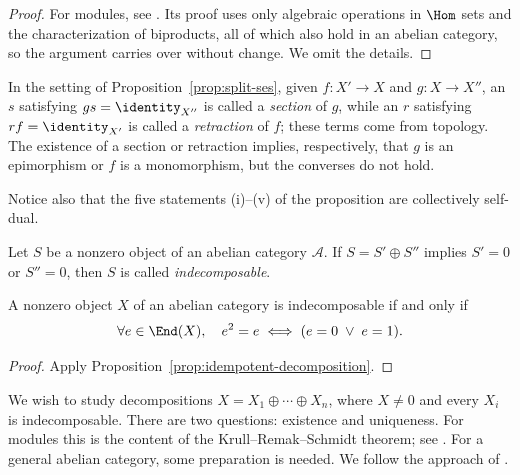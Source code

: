 \begin{proof}
	For modules, see \cite[Proposition 6.8.5]{Li1}. Its proof uses only
	algebraic operations in $\Hom$ sets and the characterization of biproducts,
	all of which also hold in an abelian category, so the argument carries over
	without change. We omit the details.
\end{proof}

In the setting of Proposition~\ref{prop:split-ses}, given $f:X'\to X$ and
$g:X\to X''$, an $s$ satisfying $gs=\identity_{X''}$ is called a
\emph{section} of $g$, while an $r$ satisfying $rf=\identity_{X'}$ is called
a \emph{retraction} of $f$; these terms come from topology. The existence of
a section or retraction implies, respectively, that $g$ is an epimorphism or
$f$ is a monomorphism, but the converses do not hold.

Notice also that the five statements (i)--(v) of the proposition are
collectively self-dual.

\begin{definition}\label{def:indecomposable}
	Let $S$ be a nonzero object of an abelian category $\mathcal{A}$. If
	$S=S'\oplus S''$ implies $S'=0$ or $S''=0$, then $S$ is called
	\emph{indecomposable}.
\end{definition}

\begin{corollary}\label{prop:indecomposable-criterion}
	A nonzero object $X$ of an abelian category is indecomposable if and only
	if
	\[ \forall e \in \End(X), \quad e^2 = e \iff (e = 0 \;\vee\; e = 1). \]
\end{corollary}
\begin{proof}
	Apply Proposition~\ref{prop:idempotent-decomposition}.
\end{proof}

We wish to study decompositions $X=X_1\oplus\cdots\oplus X_n$, where
$X\neq0$ and every $X_i$ is indecomposable. There are two questions:
existence and uniqueness. For modules this is the content of the
Krull--Remak--Schmidt theorem; see \cite[Corollary 6.12.9]{Li1}. For a
general abelian category, some preparation is needed. We follow the approach
of \cite{Kr15}.

